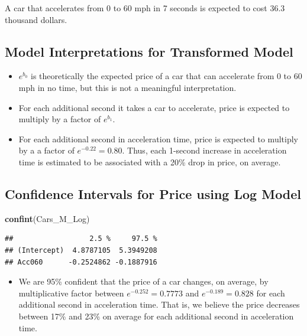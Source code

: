 \documentclass[]{book}
\newenvironment{Shaded}{\begin{snugshade}}{\end{snugshade}}
\newcommand{\KeywordTok}[1]{\textcolor[rgb]{0.13,0.29,0.53}{\textbf{#1}}}
\newcommand{\NormalTok}[1]{#1}
\providecommand{\tightlist}{%
  \setlength{\itemsep}{0pt}\setlength{\parskip}{0pt}}
\begin{document}
A car that accelerates from 0 to 60 mph in 7 seconds is expected to cost
36.3 thousand dollars.

\subsection{Model Interpretations for Transformed
Model}\label{model-interpretations-for-transformed-model}

\begin{itemize}
\item
  \(e^{b_0}\) is theoretically the expected price of a car that can
  accelerate from 0 to 60 mph in no time, but this is not a meaningful
  interpretation.
\item
  For each additional second it takes a car to accelerate, price is
  expected to multiply by a factor of \(e^{b_1}\).
\item
  For each additional second in acceleration time, price is expected to
  multiply by a a factor of \(e^{-0.22} = 0.80\). Thus, each 1-second
  increase in acceleration time is estimated to be associated with a
  20\% drop in price, on average.
\end{itemize}

\subsection{Confidence Intervals for Price using Log
Model}\label{confidence-intervals-for-price-using-log-model}

\begin{Shaded}
\begin{Highlighting}[]
\KeywordTok{confint}\NormalTok{(Cars_M_Log)}
\end{Highlighting}
\end{Shaded}

\begin{verbatim}
##                  2.5 %     97.5 %
## (Intercept)  4.8787105  5.3949208
## Acc060      -0.2524862 -0.1887916
\end{verbatim}

\begin{itemize}
\tightlist
\item
  We are 95\% confident that the price of a car changes, on average, by
  multiplicative factor between \(e^{-0.252} = 0.7773\) and
  \(e^{-0.189}=0.828\) for each additional second in acceleration time.
  That is, we believe the price decreases between 17\% and 23\% on
  average for each additional second in acceleration time.
\end{itemize}
\end{document}
